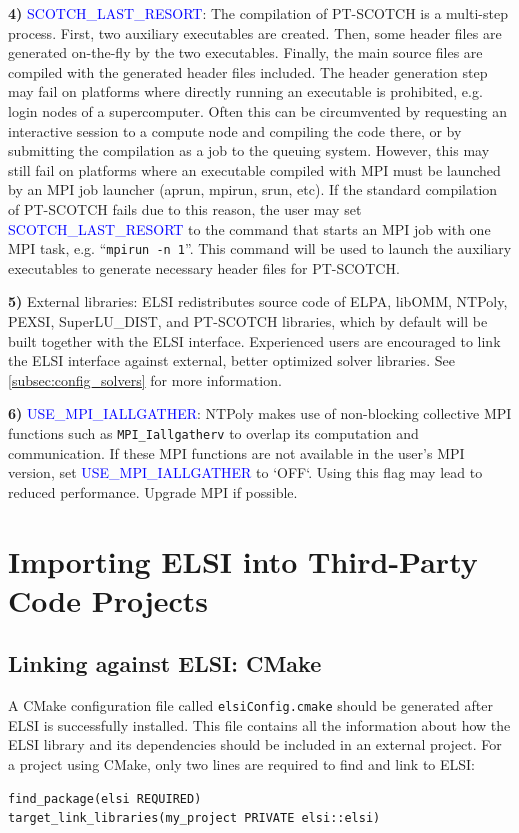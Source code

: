\documentclass{report}
\newcommand{\tcb}[1]{\textcolor{blue}{#1}}
\begin{document}
\textbf{4)} \tcb{SCOTCH\_LAST\_RESORT}: The compilation of PT-SCOTCH is a multi-step process. First, two auxiliary executables are created. Then, some header files are generated on-the-fly by the two executables. Finally, the main source files are compiled with the generated header files included. The header generation step may fail on platforms where directly running an executable is prohibited, e.g. login nodes of a supercomputer. Often this can be circumvented by requesting an interactive session to a compute node and compiling the code there, or by submitting the compilation as a job to the queuing system. However, this may still fail on platforms where an executable compiled with MPI must be launched by an MPI job launcher (aprun, mpirun, srun, etc). If the standard compilation of PT-SCOTCH fails due to this reason, the user may set \tcb{SCOTCH\_LAST\_RESORT} to the command that starts an MPI job with one MPI task, e.g. ``\verb+mpirun -n 1+''. This command will be used to launch the auxiliary executables to generate necessary header files for PT-SCOTCH.

\textbf{5)} External libraries: ELSI redistributes source code of ELPA, libOMM, NTPoly, PEXSI, SuperLU\_DIST, and PT-SCOTCH libraries, which by default will be built together with the ELSI interface. Experienced users are encouraged to link the ELSI interface against external, better optimized solver libraries. See \ref{subsec:config_solvers} for more information.

\textbf{6)} \tcb{USE\_MPI\_IALLGATHER}: NTPoly makes use of non-blocking collective MPI functions such as \texttt{MPI\_Iallgatherv} to overlap its computation and communication. If these MPI functions are not available in the user's MPI version, set \tcb{USE\_MPI\_IALLGATHER} to `OFF`. Using this flag may lead to reduced performance. Upgrade MPI if possible.

\section{Importing ELSI into Third-Party Code Projects}
\label{sec:import}
\subsection{Linking against ELSI: CMake}
\label{subsec:import_cmake}
A CMake configuration file called \texttt{elsiConfig.cmake} should be generated after ELSI is successfully installed. This file contains all the information about how the ELSI library and its dependencies should be included in an external project. For a project using CMake, only two lines are required to find and link to ELSI:
\begin{tcolorbox}
\begin{verbatim}
find_package(elsi REQUIRED)
target_link_libraries(my_project PRIVATE elsi::elsi)
\end{verbatim}
\end{tcolorbox}
\end{document}
